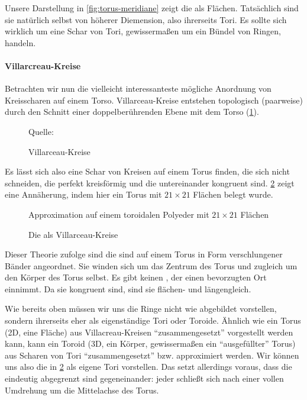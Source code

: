Unsere Darstellung in \cref{fig:torus-meridiane} zeigt die  als Flächen. Tatsächlich sind sie natürlich selbst von höherer Diemension, also ihrerseits Tori. Es sollte sich wirklich um eine Schar von Tori, gewissermaßen um ein Bündel von Ringen, handeln.

\paragraph{Villarcreau-Kreise}
Betrachten wir nun die vielleicht interessanteste mögliche Anordnung von Kreisscharen auf einem Torso. Villarceau-Kreise  entstehen topologisch (paarweise) durch den Schnitt einer doppelberührenden Ebene mit dem Torso (\cref{fig:villarceaukreise}).

\begin{figure}[ht!]
    \centering
    
    \caption{Villarceau-Kreise} Quelle:  \cite{villarceauag2gaeh}
    \label{fig:villarceaukreise}
\end{figure}

Es lässt sich also eine Schar von Kreisen auf einem Torus finden, die sich nicht schneiden, die perfekt kreisförmig und die untereinander kongruent sind. \cref{fig:villarceautorous} zeigt eine Annäherung, indem hier ein Torus mit $21\times 21$ Flächen belegt wurde.

\begin{figure}[ht!] 
    \centering
                        
    \caption{Die  als Villarceau-Kreise} Approximation auf einem toroidalen Polyeder mit $21\times21$ Flächen
    \label{fig:villarceautorous}
\end{figure}


Dieser Theorie zufolge sind die  sind auf einem Torus in Form verschlungener Bänder angeordnet. Sie winden sich um das Zentrum des Torus und zugleich um den Körper des Torus selbst. 
Es gibt keinen , der einen bevorzugten Ort einnimmt. Da sie kongruent sind, sind sie flächen- und längengleich.


Wie bereits oben müssen wir uns die Ringe nicht wie abgebildet vorstellen, sondern ihrerseits eher als eigenständige Tori oder Toroide. Ähnlich wie ein Torus (2D, eine Fläche) aus Villacreau-Kreisen "`zusammengesetzt"' vorgestellt werden kann, kann ein Toroid (3D, ein Körper, gewissermaßen ein "`ausgefüllter"' Torus) aus Scharen von Tori "`zusammengesetzt"' bzw. approximiert werden. 
Wir können uns also die  in \cref{fig:villarceautorous} als eigene Tori vorstellen.
Das setzt allerdings voraus, dass die  eindeutig abgegrenzt sind gegeneinander: jeder  schließt sich nach einer vollen Umdrehung um die Mittelachse des Torus. 

